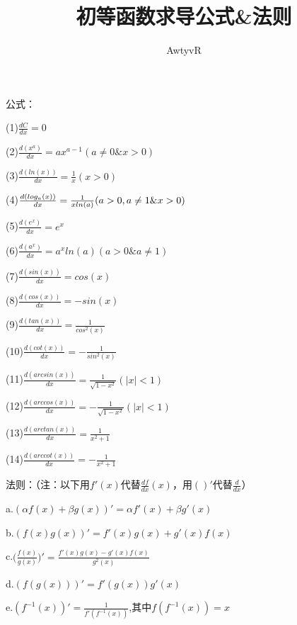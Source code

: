 \documentclass[UTF8]{ctexart}
\title{初等函数求导公式\&法则}
\author{AwtyvR}
\begin{document}
\maketitle

\Large

公式：

(1)$\frac{dC}{dx}=0$

(2)$\frac{d(x^a)}{dx}=ax^{a-1}(a\neq0\&x>0)$

(3)$\frac{d(ln(x))}{dx}=\frac{1}{x}(x>0)$

(4)$\frac{d(log_a(x))}{dx}=\frac{1}{x\space{}ln(a)}(a>0,a\neq1\&x>0)$

(5)$\frac{d(e^x)}{dx}=e^x$

(6)$\frac{d(a^x)}{dx}=a^xln(a)(a>0\&a\neq1)$

(7)$\frac{d(sin(x))}{dx}=cos(x)$

(8)$\frac{d(cos(x))}{dx}=-sin(x)$

(9)$\frac{d(tan(x))}{dx}=\frac{1}{cos^2(x)}$

(10)$\frac{d(cot(x))}{dx}=-\frac{1}{sin^2(x)}$

(11)$\frac{d(arcsin(x))}{dx}=\frac{1}{\sqrt{1-x^2}}(\lvert{x}\rvert<1)$

(12)$\frac{d(arccos(x))}{dx}=-\frac{1}{\sqrt{1-x^2}}(\lvert{x}\rvert<1)$

(13)$\frac{d(arctan(x))}{dx}=\frac{1}{x^2+1}$

(14)$\frac{d(arccot(x))}{dx}=-\frac{1}{x^2+1}$

法则：（注：以下用$f'(x)$代替$\frac{df}{dx}(x)$，用$()'$代替$\frac{d}{dx}$）

a.$({\alpha}f(x)+{\beta}g(x))'={\alpha}f'(x)+{\beta}g'(x)$

b.$(f(x)g(x))'=f'(x)g(x)+g'(x)f(x)$

c.$\bigl(\frac{f(x)}{g(x)}\bigr)'=\frac{f'(x)g(x)-g'(x)f(x)}{g^2(x)}$

d.$(f(g(x)))'=f'(g(x))g'(x)$

e.$(f^{-1}(x))'=\frac{1}{f'(f^{-1}(x))}$,其中$f(f^{-1}(x))=x$
\end{document}
